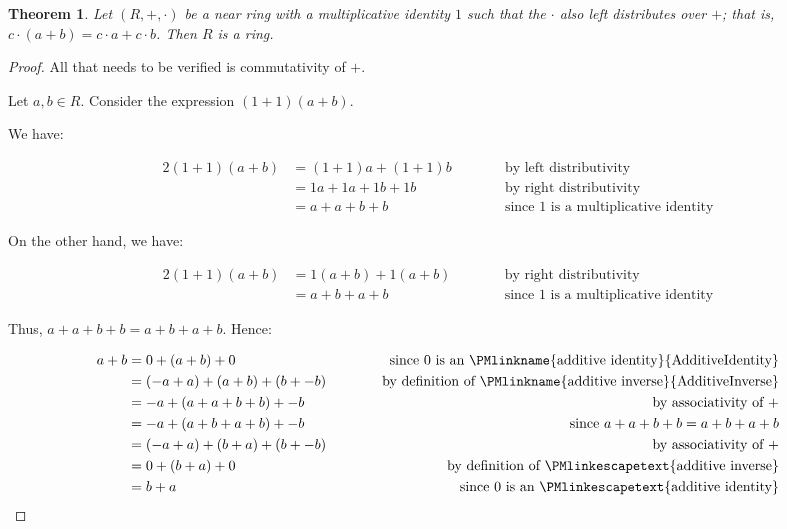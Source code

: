 \documentclass[12pt]{article}
\newtheorem{thm*}{Theorem}
\begin{document}

\begin{thm*}
Let $(R,+,\cdot)$ be a near ring with a multiplicative identity $1$ such that the $\cdot$ also left distributes over $+$; that is, $c\cdot (a+b)=c\cdot a+c\cdot b$. Then $R$ is a ring.
\end{thm*}

\begin{proof}
All that needs to be verified is commutativity of $+$.

Let $a,b\in R$.  Consider the expression $(1+1)(a+b)$.

We have:

\begin{alignat*}{2}
(1+1)(a+b) &=(1+1)a+(1+1)b & \quad \qquad \text{by left distributivity} \\
&=1a+1a+1b+1b & \quad \qquad \text{by right distributivity} \\
&=a+a+b+b & \quad \qquad \text{since } 1 \text{ is a multiplicative identity} \end{alignat*}

On the other hand, we have:

\begin{alignat*}{2}
(1+1)(a+b) &=1(a+b)+1(a+b) & \quad \qquad \text{by right distributivity} \\
&=a+b+a+b & \quad \qquad \text{since } 1 \text{ is a multiplicative identity} \end{alignat*}

Thus, $a+a+b+b=a+b+a+b$.  Hence:

\begin{alignat*}{2}
a+b &=0+(a+b)+0 & \quad \qquad \text{since } 0 \text{ is an \PMlinkname{additive identity}{AdditiveIdentity}} \\
&=(-a+a)+(a+b)+(b+-b) & \quad \qquad \text{by definition of \PMlinkname{additive inverse}{AdditiveInverse}} \\
&=-a+(a+a+b+b)+-b & \quad \qquad \text{by associativity of } + \\
&=-a+(a+b+a+b)+-b & \quad \qquad \text{since } a+a+b+b=a+b+a+b \\
&=(-a+a)+(b+a)+(b+-b) & \quad \qquad \text{by associativity of } + \\
&=0+(b+a)+0 & \quad \qquad \text{by definition of \PMlinkescapetext{additive inverse}} \\
&=b+a & \quad \qquad \text{since } 0 \text{ is an \PMlinkescapetext{additive identity}} \end{alignat*}
\end{proof}
\end{document}
